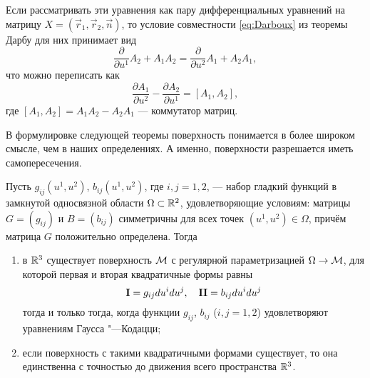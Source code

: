 Если рассматривать эти уравнения как пару дифференциальных уравнений на матрицу $X = (\vec{r}_1, \vec{r}_2, \vec{n})$, то условие совместности \eqref{eq:Darboux} из теоремы Дарбу для них принимает вид
\[
	\frac{\partial}{\partial u^1}A_2 + A_1A_2 = \frac{\partial}{\partial u^2}A_1 + A_2A_1,
\]
что можно переписать как
\begin{equation} \label{eq:Jointness}
	\frac{\partial A_1}{\partial u^2} - \frac{\partial A_2}{\partial u^1} = [A_1, A_2],
\end{equation}
где $[A_1, A_2] = A_1A_2 - A_2A_1$ --- коммутатор матриц.

В формулировке следующей теоремы поверхность понимается в более широком смысле, чем в наших определениях. А именно, поверхности разрешается иметь самопересечения.

\begin{theorem}[Бонне]
	Пусть $g_{ij}(u^1, u^2)$, $b_{ij}(u^1, u^2)$, где $i, j = 1, 2$, --- набор гладкий функций в замкнутой односвязной области $\Omega \subset \mathbb{R}^2$, удовлетворяющие условиям: матрицы $G = (g_{ij})$ и $B = (b_{ij})$ симметричны для всех точек $(u^1, u^2) \in \Omega$, причём матрица $G$ положительно определена. Тогда
	\begin{enumerate}[nolistsep, label=(\arabic*)]
		\item в $\mathbb{R}^3$ существует поверхность $\mathcal{M}$ с регулярной параметризацией $\Omega \to \mathcal{M}$, для которой первая и вторая квадратичные формы равны
			\[
				\boldsymbol{\operatorname{I}} = g_{ij}du^idu^j,\quad\boldsymbol{\operatorname{II}} = b_{ij}du^idu^j
			\]
			тогда и только тогда, когда функции $g_{ij}$, $b_{ij}$ ($i, j = 1, 2$) удовлетворяют уравнениям Гаусса "---Кодацци;
		\item если поверхность с такими квадратичными формами существует, то она единственна с точностью до движения всего пространства $\mathbb{R}^3$.
	\end{enumerate}
\end{theorem}


